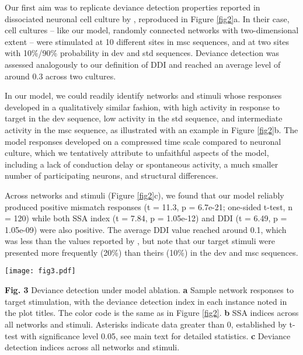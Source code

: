 \documentclass[pdflatex,referee,iicol,sn-basic]{sn-jnl}
\theoremstyle{thmstyleone}%
\theoremstyle{thmstyletwo}%
\theoremstyle{thmstylethree}%
\begin{document}
Our first aim was to replicate deviance detection properties reported in dissociated neuronal cell culture by \cite{Kubota2021-dx}, reproduced in Figure \ref{fig2}a. In their case, cell cultures -- like our model, randomly connected networks with two-dimensional extent -- were stimulated at 10 different sites in msc sequences, and at two sites with 10\%/90\% probability in dev and std sequences. Deviance detection was assessed analogously to our definition of DDI and reached an average level of around 0.3 across two cultures.

In our model, we could readily identify networks and stimuli whose responses developed in a qualitatively similar fashion, with high activity in response to target in the dev sequence, low activity in the std sequence, and intermediate activity in the msc sequence, as illustrated with an example in Figure \ref{fig2}b. The model responses developed on a compressed time scale compared to neuronal culture, which we tentatively attribute to unfaithful aspects of the model, including a lack of conduction delay or spontaneous activity, a much smaller number of participating neurons, and structural differences.

Across networks and stimuli (Figure \ref{fig2}c), we found that our model reliably produced positive mismatch responses (t = 11.3, p = 6.7e-21; one-sided t-test, n = 120) while both SSA index (t = 7.84, p = 1.05e-12) and DDI (t = 6.49, p = 1.05e-09) were also positive. The average DDI value reached around 0.1, which was less than the values reported by \cite{Kubota2021-dx}, but note that our target stimuli were presented more frequently (20\%) than theirs (10\%) in the dev and msc sequences.

\begin{figure*}%
    \centering
    \texttt{[image: fig3.pdf]}
    \caption{}
    \label{fig3}
\end{figure*}
\textbf{Fig. 3} Deviance detection under model ablation. \textbf{a} Sample network responses to target stimulation, with the deviance detection index in each instance noted in the plot titles. The color code is the same as in Figure \ref{fig2}. \textbf{b} SSA indices across all networks and stimuli. Asterisks indicate data greater than 0, established by t-test with significance level 0.05, see main text for detailed statistics. \textbf{c} Deviance detection indices across all networks and stimuli.
\end{document}
